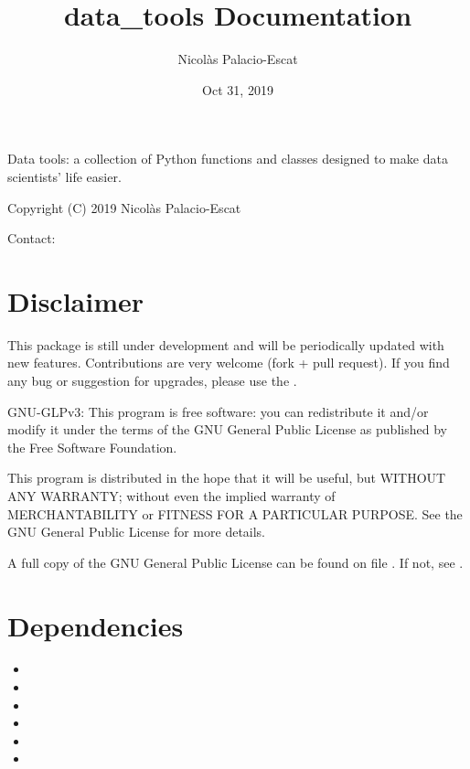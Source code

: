 \documentclass[letterpaper,10pt,english]{sphinxmanual}
\title{data\_tools Documentation}
\date{Oct 31, 2019}
\author{Nicolàs Palacio-Escat}
\begin{document}
\pagestyle{empty}
\sphinxmaketitle
\pagestyle{plain}
\sphinxtableofcontents
\pagestyle{normal}
\label{\detokenize{index::doc}}


Data tools: a collection of Python functions and classes designed to
make data scientists’ life easier.

Copyright (C) 2019 Nicolàs Palacio-Escat

Contact: 


\chapter{Disclaimer}
\label{\detokenize{index:disclaimer}}
This package is still under development and will be periodically updated
with new features. Contributions are very welcome (fork + pull request).
If you find any bug or suggestion for upgrades, please use the
.

GNU-GLPv3:
This program is free software: you can redistribute it and/or modify it
under the terms of the GNU General Public License as published by the
Free Software Foundation.

This program is distributed in the hope that it will be useful, but
WITHOUT ANY WARRANTY; without even the implied warranty of
MERCHANTABILITY or FITNESS FOR A PARTICULAR PURPOSE. See the GNU General
Public License for more details.

A full copy of the GNU General Public License can be found on file
.
If not, see .


\chapter{Dependencies}
\label{\detokenize{index:dependencies}}\begin{itemize}
\item {} 

\item {} 

\item {} 

\item {} 

\item {} 

\item {} 

\end{itemize}
\end{document}
